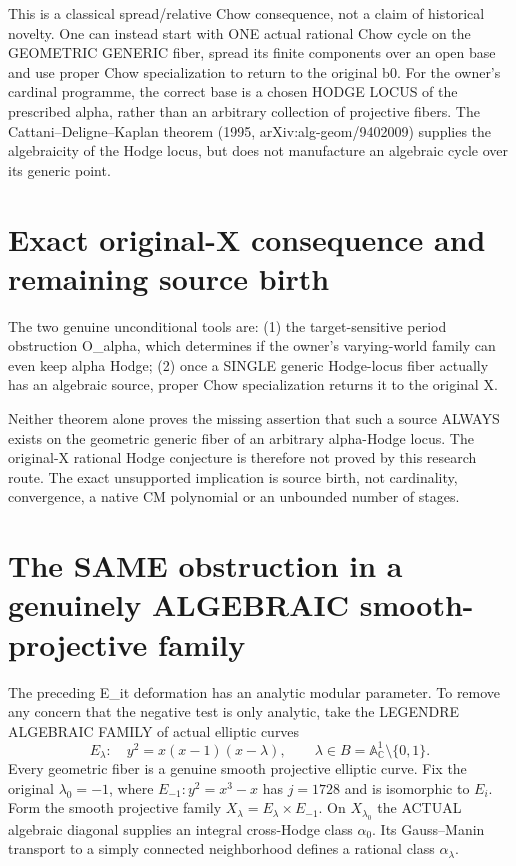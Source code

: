 \documentclass[11pt]{article}
\begin{document}
This is a classical spread/relative Chow consequence,
not a claim of historical novelty. One can instead
start with ONE actual rational Chow cycle on the
GEOMETRIC GENERIC fiber, spread its finite components
over an open base and use proper Chow specialization
to return to the original b0.
For the owner's cardinal programme, the correct base
is a chosen HODGE LOCUS of the prescribed alpha,
rather than an arbitrary collection of projective fibers.
The Cattani--Deligne--Kaplan theorem
(1995, arXiv:alg-geom/9402009) supplies the algebraicity
of the Hodge locus, but does not manufacture
an algebraic cycle over its generic point.

\section{Exact original-X consequence and remaining source birth}
The two genuine unconditional tools are:
(1) the target-sensitive period obstruction O_alpha,
which determines if the owner's varying-world family
can even keep alpha Hodge;
(2) once a SINGLE generic Hodge-locus fiber actually
has an algebraic source, proper Chow specialization
returns it to the original X.

Neither theorem alone proves the missing assertion
that such a source ALWAYS exists on the geometric
generic fiber of an arbitrary alpha-Hodge locus.
The original-X rational Hodge conjecture is
therefore not proved by this research route.
The exact unsupported implication is source birth,
not cardinality, convergence, a native
CM polynomial or an unbounded number of stages.

\section{The SAME obstruction in a genuinely ALGEBRAIC smooth-projective family}
The preceding E_it deformation has an analytic
modular parameter. To remove any concern that
the negative test is only analytic, take the
LEGENDRE ALGEBRAIC FAMILY of actual elliptic curves
\[
E_\lambda:\quad y^2=x(x-1)(x-\lambda),\qquad
\lambda\in B=\mathbb A^1_{\mathbb C}\setminus\{0,1\}.
\]
Every geometric fiber is a genuine smooth projective
elliptic curve. Fix the original $\lambda_0=-1$,
where $E_{-1}:y^2=x^3-x$ has $j=1728$ and
is isomorphic to $E_i$. Form the smooth projective
family $X_\lambda=E_\lambda\times E_{-1}$.
On $X_{\lambda_0}$ the ACTUAL algebraic diagonal
supplies an integral cross-Hodge class $\alpha_0$.
Its Gauss--Manin transport to a simply connected
neighborhood defines a rational class $\alpha_\lambda$.
\end{document}
